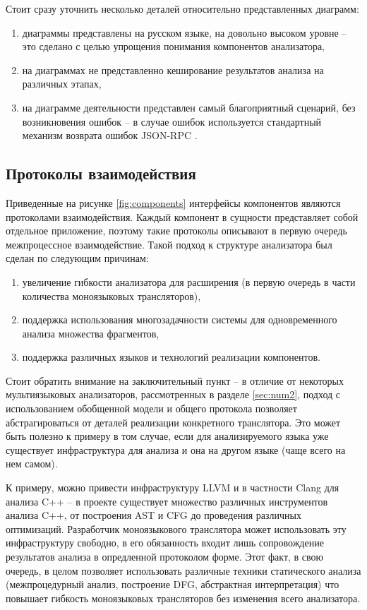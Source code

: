 Стоит сразу уточнить несколько деталей относительно представленных диаграмм:
\begin{enumerate}[1)]
    \item диаграммы представлены на русском языке, на довольно высоком уровне -- это сделано с целью упрощения
    понимания компонентов анализатора,
    \item на диаграммах не представленно кеширование результатов анализа на различных этапах,
    \item на диаграмме деятельности представлен самый благоприятный сценарий, без возникновения ошибок -- в случае ошибок
    используется стандартный механизм возврата ошибок JSON-RPC \cite{JSON-RPC}.
\end{enumerate}

\subsection{Протоколы взаимодействия}

Приведенные на рисунке \ref{fig:components} интерфейсы компонентов являются протоколами взаимодействия.
Каждый компонент в сущности представляет собой отдельное приложение, поэтому такие протоколы описывают в первую очередь межпроцессное взаимодействие.
Такой подход к структуре анализатора был сделан по следующим причинам:
\begin{enumerate}[1)]
    \item увеличение гибкости анализатора для расширения (в первую очередь в части количества моноязыковых трансляторов),
    \item поддержка использования многозадачности системы для одновременного анализа множества фрагментов,
    \item поддержка различных языков и технологий реализации компонентов.
\end{enumerate}

Стоит обратить внимание на заключительный пункт -- в отличие от некоторых мультиязыковых анализаторов, рассмотренных в разделе \ref{sec:num2},
подход с использованием обобщенной модели и общего протокола позволяет абстрагироваться от деталей реализации конкретного транслятора.
Это может быть полезно к примеру в том случае, если для анализируемого языка уже существует инфраструктура для анализа и она на другом языке
(чаще всего на нем самом). 

К примеру, можно привести инфраструктуру LLVM и в частности Clang для анализа C++ --
в проекте существует множество различных инструментов анализа C++, от построения AST и CFG до проведения различных оптимизаций.
Разработчик моноязыкового транслятора может использовать эту инфраструктуру свободно, в его обязанность входит лишь
сопровождение результатов анализа в опредленной протоколом форме.
Этот факт, в свою очередь, в целом позволяет использовать различные техники статического анализа (межпроцедурный анализ, построение DFG,
абстрактная интерпретация) что повышает гибкость моноязыковых трансляторов без изменения всего анализатора. 

